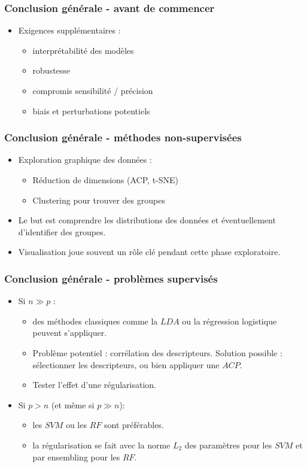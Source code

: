 \begin{frame}
\frametitle{Conclusion générale - avant de commencer}
\begin{itemize}
  \item Exigences supplémentaires : 
  \begin{itemize}
    \item interprétabilité des modèles
    \item robustesse 
    \item compromis sensibilité / précision
    \item biais et perturbations potentiels
  \end{itemize}
\end{itemize}
\end{frame}

\begin{frame}
\frametitle{Conclusion générale - méthodes non-supervisées}
\begin{itemize}
  \item Exploration graphique des données : 
  \begin{itemize}
    \item Réduction de dimensions (ACP, t-SNE)
    \item Clustering pour trouver des groupes
  \end{itemize}
  \item Le but est comprendre les distributions des données et éventuellement d'identifier des groupes. 
  \item Visualisation joue souvent un rôle clé pendant cette phase exploratoire.
\end{itemize}
\end{frame}

\begin{frame}
\frametitle{Conclusion générale - problèmes supervisés}
\begin{itemize}
  \item Si $n \gg p$ : 
  \begin{itemize}
    \item des méthodes classiques comme la $LDA$ ou la régression logistique peuvent s'appliquer. 
    \item Problème potentiel : corrélation des descripteurs. Solution possible : sélectionner les descripteurs, ou bien appliquer une $ACP$. 
    \item Tester l'effet d'une régularisation. 
  \end{itemize}
  \item Si $p > n$ (et même si $p \gg n$): 
  \begin{itemize}
    \item les $SVM$ ou les $RF$ sont préférables. 
    \item la régularisation se fait avec la norme $L_2$ des paramètres pour les $SVM$ et par ensembling pour les $RF$. 
  \end{itemize}
\end{itemize}
\end{frame}



